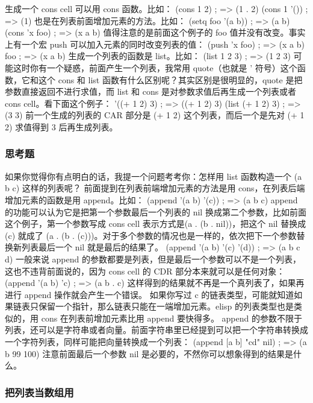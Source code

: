 \documentclass[11pt]{ctexart}
\begin{document}
生成一个 cons cell 可以用 cons 函数。比如：
(cons 1 2)                              ; => (1 . 2)
(cons 1 '())                            ; => (1)
也是在列表前面增加元素的方法。比如：
(setq foo '(a b))                       ; => (a b)
(cons 'x foo)                           ; => (x a b)
值得注意的是前面这个例子的 foo 值并没有改变。事实上有一个宏 push 可以加入元素的同时改变列表的值：
(push 'x foo)                           ; => (x a b)
foo                                     ; => (x a b)
生成一个列表的函数是 list。比如：
(list 1 2 3)                            ; => (1 2 3)
可能这时你有一个疑惑，前面产生一个列表，我常用 quote（也就是 ' 符号）这个函数，它和这个 cons 和 list 函数有什么区别呢？其实区别是很明显的，quote 是把参数直接返回不进行求值，而 list 和 cons 是对参数求值后再生成一个列表或者 cons cell。看下面这个例子：
'((+ 1 2) 3)                            ; => ((+ 1 2) 3)
(list (+ 1 2) 3)                        ; => (3 3)
前一个生成的列表的 CAR 部分是 (+ 1 2) 这个列表，而后一个是先对 (+ 1 2) 求值得到
3 后再生成列表。

\subsubsection{思考题}
\label{sec:org06f9986}

如果你觉得你有点明白的话，我提一个问题考考你：怎样用 list 函数构造一个 (a b c)
这样的列表呢？
前面提到在列表前端增加元素的方法是用 cons，在列表后端增加元素的函数是用 append。比如：
(append '(a b) '(c))                    ; => (a b c)
append 的功能可以认为它是把第一个参数最后一个列表的 nil 换成第二个参数，比如前面这个例子，第一个参数写成 cons cell 表示方式是(a . (b . nil))，把这个 nil 替换成 (c) 就成了 (a . (b . (c)))。对于多个参数的情况也是一样的，依次把下一个参数替换新列表最后一个 nil 就是最后的结果了。
(append '(a b) '(c) '(d))               ; => (a b c d)
一般来说 append 的参数都要是列表，但是最后一个参数可以不是一个列表，这也不违背前面说的，因为 cons cell 的 CDR 部分本来就可以是任何对象：
(append '(a b) 'c)                      ; => (a b . c)
这样得到的结果就不再是一个真列表了，如果再进行 append 操作就会产生一个错误。
如果你写过 c 的链表类型，可能就知道如果链表只保留一个指针，那么链表只能在一端增加元素。elisp 的列表类型也是类似的，用 cons 在列表前增加元素比用 append 要快得多。
append 的参数不限于列表，还可以是字符串或者向量。前面字符串里已经提到可以把一个字符串转换成一个字符列表，同样可能把向量转换成一个列表：
(append [a b] "cd" nil)                 ; => (a b 99 100)
注意前面最后一个参数 nil 是必要的，不然你可以想象得到的结果是什么。
\subsubsection{把列表当数组用}
\label{sec:org976af5c}
\end{document}
